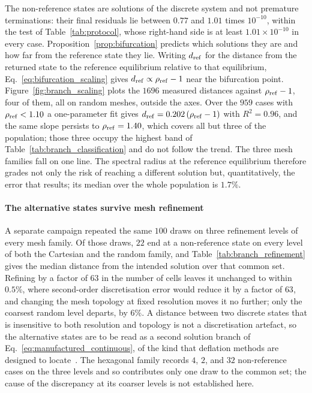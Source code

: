 The non-reference states are solutions of the discrete system and not premature terminations: their final residuals lie between $0.77$ and $1.01$ times $10^{-10}$, within the test of Table~\ref{tab:protocol}, whose right-hand side is at least $1.01\times10^{-10}$ in every case. Proposition~\ref{prop:bifurcation} predicts which solutions they are and how far from the reference state they lie. Writing $d_{\rm ref}$ for the distance from the returned state to the reference equilibrium relative to that equilibrium, Eq.~\eqref{eq:bifurcation_scaling} gives $d_{\rm ref}\propto\rho_{\rm ref}-1$ near the bifurcation point. Figure~\ref{fig:branch_scaling} plots the $1696$ measured distances against $\rho_{\rm ref}-1$, four of them, all on random meshes, outside the axes. Over the $959$ cases with $\rho_{\rm ref}<1.10$ a one-parameter fit gives $d_{\rm ref}=0.202\,(\rho_{\rm ref}-1)$ with $R^{2}=0.96$, and the same slope persists to $\rho_{\rm ref}=1.40$, which covers all but three of the population; those three occupy the highest band of Table~\ref{tab:branch_classification} and do not follow the trend. The three mesh families fall on one line. The spectral radius at the reference equilibrium therefore grades not only the risk of reaching a different solution but, quantitatively, the error that results; its median over the whole population is $1.7\%$.

\paragraph{The alternative states survive mesh refinement}
A separate campaign repeated the same $100$ draws on three refinement levels of every mesh family. Of those draws, $22$ end at a non-reference state on every level of both the Cartesian and the random family, and Table~\ref{tab:branch_refinement} gives the median distance from the intended solution over that common set. Refining by a factor of $63$ in the number of cells leaves it unchanged to within $0.5\%$, where second-order discretisation error would reduce it by a factor of $63$, and changing the mesh topology at fixed resolution moves it no further; only the coarsest random level departs, by $6\%$. A distance between two discrete states that is insensitive to both resolution and topology is not a discretisation artefact, so the alternative states are to be read as a second solution branch of Eq.~\eqref{eq:manufactured_continuous}, of the kind that deflation methods are designed to locate~\cite{Farrell2015DeflationEquations}. The hexagonal family records $4$, $2$, and $32$ non-reference cases on the three levels and so contributes only one draw to the common set; the cause of the discrepancy at its coarser levels is not established here.

